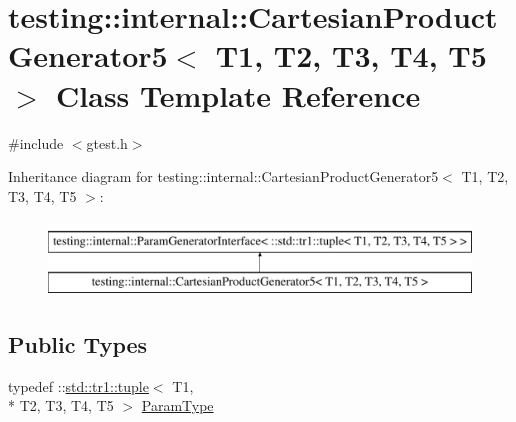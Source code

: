 \hypertarget{classtesting_1_1internal_1_1_cartesian_product_generator5}{\section{testing\-:\-:internal\-:\-:Cartesian\-Product\-Generator5$<$ T1, T2, T3, T4, T5 $>$ Class Template Reference}
\label{classtesting_1_1internal_1_1_cartesian_product_generator5}
}


{\ttfamily \#include $<$gtest.\-h$>$}

Inheritance diagram for testing\-:\-:internal\-:\-:Cartesian\-Product\-Generator5$<$ T1, T2, T3, T4, T5 $>$\-:\begin{figure}[H]
\begin{center}
\leavevmode
\includegraphics[height=2.000000cm]{classtesting_1_1internal_1_1_cartesian_product_generator5}
\end{center}
\end{figure}
\subsection*{Public Types}
\begin{DoxyCompactItemize}
\item 
typedef \-::\hyperlink{classstd_1_1tr1_1_1tuple}{std\-::tr1\-::tuple}$<$ T1, \\*
T2, T3, T4, T5 $>$ \hyperlink{classtesting_1_1internal_1_1_cartesian_product_generator5_a081ee8effde35f8caa9ec79cf9c29cbd}{Param\-Type}
\end{DoxyCompactItemize}
